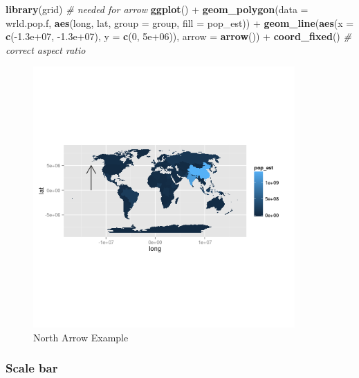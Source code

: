\documentclass[]{article}
\newenvironment{Shaded}{}{}
\newcommand{\KeywordTok}[1]{\textcolor[rgb]{0.00,0.44,0.13}{\textbf{{#1}}}}
\newcommand{\DataTypeTok}[1]{\textcolor[rgb]{0.56,0.13,0.00}{{#1}}}
\newcommand{\DecValTok}[1]{\textcolor[rgb]{0.25,0.63,0.44}{{#1}}}
\newcommand{\FloatTok}[1]{\textcolor[rgb]{0.25,0.63,0.44}{{#1}}}
\newcommand{\CommentTok}[1]{\textcolor[rgb]{0.38,0.63,0.69}{\textit{{#1}}}}
\newcommand{\NormalTok}[1]{{#1}}
\let\Oldincludegraphics\includegraphics
\renewcommand{\includegraphics}[1]{\Oldincludegraphics[width=10cm]{#1}}
\begin{document}
\begin{Shaded}
\begin{Highlighting}[]
\KeywordTok{library}\NormalTok{(grid)  }\CommentTok{# needed for arrow}
\KeywordTok{ggplot}\NormalTok{() + }\KeywordTok{geom_polygon}\NormalTok{(}\DataTypeTok{data =} \NormalTok{wrld.pop.f, }\KeywordTok{aes}\NormalTok{(long, lat, }\DataTypeTok{group =} \NormalTok{group, }\DataTypeTok{fill =} \NormalTok{pop_est)) + }
    \KeywordTok{geom_line}\NormalTok{(}\KeywordTok{aes}\NormalTok{(}\DataTypeTok{x =} \KeywordTok{c}\NormalTok{(-}\FloatTok{1.3e+07}\NormalTok{, -}\FloatTok{1.3e+07}\NormalTok{), }\DataTypeTok{y =} \KeywordTok{c}\NormalTok{(}\DecValTok{0}\NormalTok{, }\FloatTok{5e+06}\NormalTok{)), }\DataTypeTok{arrow =} \KeywordTok{arrow}\NormalTok{()) + }
    \KeywordTok{coord_fixed}\NormalTok{()  }\CommentTok{# correct aspect ratio}
\end{Highlighting}
\end{Shaded}
\begin{figure}[htbp]
\centering
\includegraphics{figure/North_Arrow_Example.png}
\caption{North Arrow Example}
\end{figure}

\subsubsection{Scale bar}
\end{document}
